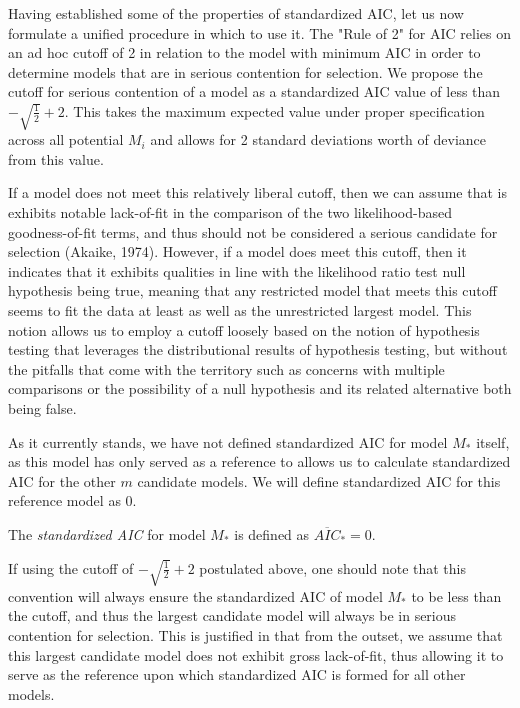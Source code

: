 		Having established some of the properties of standardized AIC, let us now formulate a unified procedure in which to use it. The "Rule of 2" for AIC relies on an ad hoc cutoff of 2 in 
		relation to the model with minimum AIC in order to determine models that are in serious contention for selection. We propose the cutoff for serious contention of a model as a
		standardized AIC value of less than $-\sqrt{\frac{1}{2}} + 2$. This takes the maximum expected value under proper specification across all potential $M_i$ and allows for 2 standard deviations worth of
		deviance from this value.
		
		If a model does not meet this relatively liberal cutoff, then we can assume that is exhibits notable lack-of-fit in the comparison of the two likelihood-based goodness-of-fit terms,
		and thus should not be considered a serious candidate for selection (Akaike, 1974). However, if a model does meet this cutoff, then it indicates that it exhibits qualities in line with the
		likelihood ratio test null hypothesis being true, meaning that any restricted model that meets this cutoff seems to fit the data at least as well as the unrestricted largest model.
		This notion allows us to employ a cutoff loosely based on the notion of hypothesis testing that leverages the distributional results of hypothesis testing, but without the pitfalls
		that come with the territory such as concerns with multiple comparisons or the possibility of a null hypothesis and its related alternative both being false.

		As it currently stands, we have not defined standardized AIC for model $M_*$ itself, as this model has only served as a reference to allows us to calculate standardized AIC for the
		other $m$ candidate models. We will define standardized AIC for this reference model as $0$.
		\begin{definition}
			The \textit{standardized AIC} for model $M_*$ is defined as $\overline{AIC}_* = 0$.
		\end{definition}
		If using the cutoff of $-\sqrt{\frac{1}{2}} + 2$ postulated above, one should note that this convention will always ensure the standardized AIC of model $M_*$ to be less than the
		cutoff, and thus the largest candidate model will always be in serious contention for selection. This is justified in that from the outset, we assume that this largest
		candidate model does not exhibit gross lack-of-fit, thus allowing it to serve as the reference upon which standardized AIC is formed for all other models.

